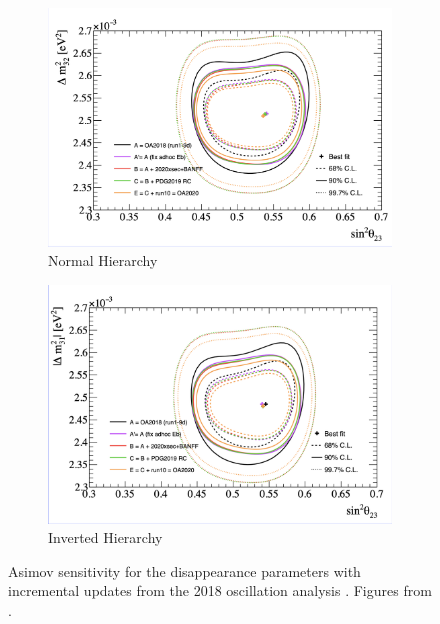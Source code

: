 \begin{figure}[!htbp]
\centering
\begin{subfigure}{.7\textwidth}
  \centering
  \includegraphics[width=0.95\linewidth, trim={0.5mm 0.5mm 0mm 0mm}, clip]{figs/jointPTheta_disNH}
  \caption{Normal Hierarchy}
  \label{fig:20182020PTDisNH}
\end{subfigure}
\begin{subfigure}{.7\textwidth}
  \centering
  \includegraphics[width=0.95\linewidth, trim={1mm 0.5mm 0.5mm 0mm},clip]{figs/jointPTheta_disIH}
  \caption{Inverted Hierarchy}
  \label{fig:20182020PTDisIH}
\end{subfigure}
\caption{Asimov sensitivity for the disappearance parameters with incremental updates from the 2018 oscillation analysis \cite{t2knature}. Figures from \cite{tn397}.}
\label{fig:20182020DisPT}
\end{figure}


